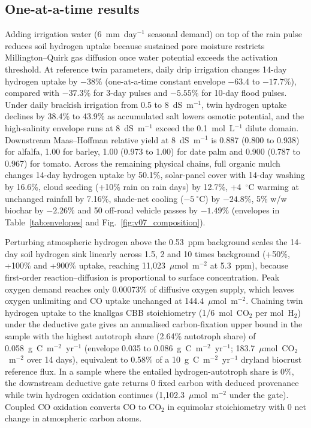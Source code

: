 \documentclass[11pt,a4paper]{article}
\begin{document}
\subsection{One-at-a-time results}
Adding irrigation water (6~mm~day$^{-1}$ seasonal demand) on top of the rain pulse reduces soil hydrogen uptake because sustained pore moisture restricts Millington--Quirk gas diffusion once water potential exceeds the activation threshold. At reference twin parameters, daily drip irrigation changes 14-day hydrogen uptake by $-38\%$ (one-at-a-time constant envelope $-63.4$ to $-17.7\%$), compared with $-37.3\%$ for 3-day pulses and $-5.55\%$ for 10-day flood pulses. Under daily brackish irrigation from 0.5 to 8~dS~m$^{-1}$, twin hydrogen uptake declines by 38.4\% to 43.9\% as accumulated salt lowers osmotic potential, and the high-salinity envelope runs at 8~dS~m$^{-1}$ exceed the 0.1~mol~L$^{-1}$ dilute domain. Downstream Maas--Hoffman relative yield at 8~dS~m$^{-1}$ is 0.887 (0.800 to 0.938) for alfalfa, 1.00 for barley, 1.00 (0.973 to 1.00) for date palm and 0.900 (0.787 to 0.967) for tomato. Across the remaining physical chains, full organic mulch changes 14-day hydrogen uptake by 50.1\%, solar-panel cover with 14-day washing by 16.6\%, cloud seeding (+10\% rain on rain days) by 12.7\%, +4~$^\circ$C warming at unchanged rainfall by 7.16\%, shade-net cooling ($-5~^\circ$C) by $-24.8\%$, 5\% w/w biochar by $-2.26\%$ and 50 off-road vehicle passes by $-1.49\%$ (envelopes in Table~\ref{tab:envelopes} and Fig.~\ref{fig:v07_composition}).

Perturbing atmospheric hydrogen above the 0.53~ppm background scales the 14-day soil hydrogen sink linearly across 1.5, 2 and 10 times background (+50\%, +100\% and +900\% uptake, reaching 11,023~$\mu$mol~m$^{-2}$ at 5.3~ppm), because first-order reaction--diffusion is proportional to surface concentration. Peak oxygen demand reaches only 0.00073\% of diffusive oxygen supply, which leaves oxygen unlimiting and CO uptake unchanged at 144.4~$\mu$mol~m$^{-2}$. Chaining twin hydrogen uptake to the knallgas CBB stoichiometry (1/6~mol~CO$_2$ per mol~H$_2$) under the deductive gate gives an annualised carbon-fixation upper bound in the sample with the highest autotroph share (2.64\% autotroph share) of 0.058~g~C~m$^{-2}$~yr$^{-1}$ (envelope 0.035 to 0.086~g~C~m$^{-2}$~yr$^{-1}$; 183.7~$\mu$mol~CO$_2$~m$^{-2}$ over 14 days), equivalent to 0.58\% of a 10~g~C~m$^{-2}$~yr$^{-1}$ dryland biocrust reference flux. In a sample where the entailed hydrogen-autotroph share is 0\%, the downstream deductive gate returns 0 fixed carbon with deduced provenance while twin hydrogen oxidation continues (1,102.3~$\mu$mol~m$^{-2}$ under the gate). Coupled CO oxidation converts CO to CO$_2$ in equimolar stoichiometry with 0 net change in atmospheric carbon atoms.
\end{document}
